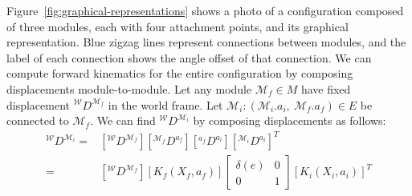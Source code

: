 \documentclass[graybox]{svmult}
\begin{document}
\begin{definition}[Configuration]

Figure~\ref{fig:graphical-representations} shows a photo of a configuration composed
of three modules, each with four attachment points, and its
graphical representation. Blue zigzag lines represent connections between
modules, and the label of each connection shows the angle offset of that
connection.
We can compute forward kinematics for the entire
configuration by composing displacements module-to-module. Let any module \(\mathcal{M}_f \in M\) have
fixed displacement \({^\mathcal{W}}D^{\mathcal{M}_f}\) in the world frame.
Let \(\mathcal{M}_i: (\mathcal{M}_i.a_i,~\mathcal{M}_f.a_f) \in E \) be connected to \(\mathcal{M}_f\).
 We can find \({^\mathcal{W}}D^{\mathcal{M}_i}\) by composing displacements as follows:
\begin{align*}
{^\mathcal{W}}D^{\mathcal{M}_i} =& [{^\mathcal{W}}D^{\mathcal{M}_f}] [{^{\mathcal{M}_f}}D^{a_f}][
{^{a_f}}D^{a_i}] [{^{\mathcal{M}_i}}D^{a_i}]^T \\
=& [{^\mathcal{W}}D^{\mathcal{M}_f}] [K_f(X_f,a_f)] \begin{bmatrix} \delta(e) & 0
\\ 0 & 1\end{bmatrix} [K_i(X_i,a_i)]^T
\end{align*}


\end{definition}
\end{document}
